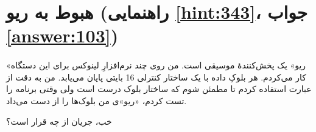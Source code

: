 \section[هبوط به ریو]{هبوط به ریو \protect{} (راهنمایی \ref{hint:343}، جواب \ref{answer:103})}
\paragraph{}\label{prog:100}
«ریو» یک پخش‌کنندهٔ موسیقی  است. من روی چند نرم‌افزارِ لینوکس برای این دستگاه کار می‌کردم. هر بلوکِ داده با یک ساختار کنترلی 16 بایتی پایان می‌یابد. من به دقت از عبارت  استفاده کردم تا مطمئن شوم که ساختار بلوک درست است ولی وقتی برنامه را تست کردم، «ریو»ی من بلوک‌ها را از دست می‌داد.

خب، جریان از چه قرار است؟

